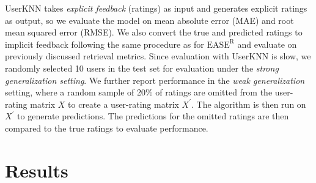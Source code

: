\documentclass{article}
\newcommand{\easer}{$\text{EASE}^\text{R}$\xspace}
\newcommand{\userknn}{UserKNN\xspace}
\begin{document}
\userknn takes {\em explicit feedback} (ratings) as input and generates
explicit ratings as output,
so we evaluate the model on mean absolute error (MAE) and root mean squared
error (RMSE).
We also convert the true and predicted ratings to implicit feedback following
 the same procedure as for \easer and evaluate on previously discussed retrieval
 metrics.
Since evaluation with \userknn is slow, we randomly selected 10 users in the
 test set for evaluation under the {\em strong generalization setting}.
We further report performance in the {\em weak generalization} setting, where a
 random sample of 20\% of ratings are omitted from the user-rating matrix $X$ to
 create a user-rating matrix $X^{\prime}$.
The algorithm is then run on $X^{\prime}$ to generate predictions.
The predictions for the omitted ratings are then compared to the true ratings
 to evaluate performance.

\section{Results}
\end{document}
